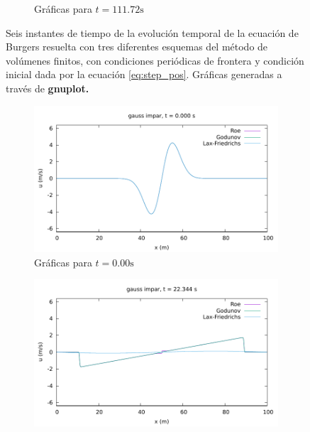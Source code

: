 \documentclass[12pt]{article}
\begin{document}
\begin{figure}[h!]
\begin{subfigure}{0.49\textwidth}
			\caption*{Gráficas para $t=111.72\unit{\second}$}
			\label{fig:step_pos-perio6}
		\end{subfigure}
		\caption{Seis instantes de tiempo de la evolución temporal de  la ecuación de Burgers resuelta con tres diferentes esquemas del método de volúmenes finitos, con condiciones periódicas de frontera y condición inicial dada por la ecuación \ref{eq:step_pos}. Gráficas generadas a través de \textbf{gnuplot.}}
		\label{fig:step_pos-periodica}
	\end{figure}

	\begin{figure}[h!]
		\centering
		\begin{subfigure}{0.49\textwidth}
			\centering
			\includegraphics[width=\textwidth]{../burgers1DVF/results/sol_periodicas/gauss_impar/000.pdf}
			\caption*{Gráficas para $t=0.00\unit{\second}$}
			\label{fig:gauss_impar-perio1}
		\end{subfigure}\hfill
		\begin{subfigure}{0.49\textwidth}
			\centering
			\includegraphics[width=\textwidth]{../burgers1DVF/results/sol_periodicas/gauss_impar/021.pdf}

\end{subfigure}
\end{figure}
\end{document}
